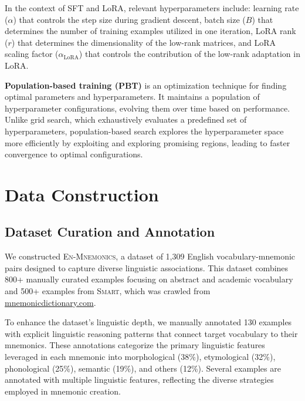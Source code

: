 \documentclass{article}
\newcounter{para}
\newcommand{\dataset}{\textsc{En-Mnemonics}}
\begin{document}
In the context of SFT and LoRA, relevant hyperparameters include: learning rate (\( \alpha \)) that controls the step size during gradient descent, batch size (\( B \)) that determines the number of training examples utilized in one iteration, LoRA rank (\( r \)) that determines the dimensionality of the low-rank matrices, and LoRA scaling factor (\( \alpha_{\text{LoRA}} \)) that controls the contribution of the low-rank adaptation in LoRA.

\textbf{Population-based training (PBT)} is an optimization technique for finding optimal parameters and hyperparameters. It maintains a population of hyperparameter configurations, evolving them over time based on performance. Unlike grid search, which exhaustively evaluates a predefined set of hyperparameters, population-based search explores the hyperparameter space more efficiently by exploiting and exploring promising regions, leading to faster convergence to optimal configurations.

\section{Data Construction} \label{sec:met-data}
\subsection{Dataset Curation and Annotation} \label{sec:curation}
We constructed \dataset, a dataset of 1,309 English vocabulary-mnemonic pairs designed to capture diverse linguistic associations. This dataset combines 800+ manually curated examples focusing on abstract and academic vocabulary and 500+ examples from \textsc{Smart}, which was crawled from \href{https:\\www.mnemonicdictionary.com}{mnemonicdictionary.com}.

To enhance the dataset's linguistic depth, we manually annotated 130 examples with explicit linguistic reasoning patterns that connect target vocabulary to their mnemonics. These annotations categorize the primary linguistic features leveraged in each mnemonic into morphological (38\%), etymological (32\%), phonological (25\%), semantic (19\%),  and others (12\%). Several examples are annotated with multiple linguistic features, reflecting the diverse strategies employed in mnemonic creation.
\end{document}
